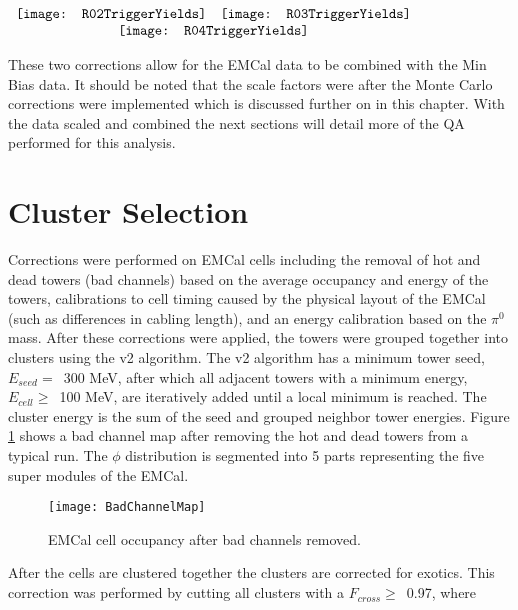 \begin{figure*}[t!]
$\begin{array}{rl}
    \texttt{[image: R02TriggerYields]} &
    \texttt{[image: R03TriggerYields]}\\
    \multicolumn{2}{c}{\texttt{[image: R04TriggerYields]}}
\end{array}$
\caption[EMCal triggered data correction factors for R=0.2, R=0.3, and R=0.4 jets.]{\label{fig:EMCalDownScale}EMCal triggered data correction factors for R=0.2, R=0.3, and R=0.4 jets.}
\end{figure*}

These two corrections allow for the EMCal data to be combined with the Min Bias data.  It should be noted that the scale factors were after the Monte Carlo corrections were implemented which is discussed further on in this chapter.  With the data scaled and combined the next sections will detail more of the QA performed for this analysis.


\section{Cluster Selection}
Corrections were performed on EMCal cells including the removal of hot and dead towers (bad channels) based on the average occupancy and energy of the towers, calibrations to cell timing caused by the physical layout of the EMCal (such as differences in cabling length), and an energy calibration based on the $\pi^{0}$ mass.  After these corrections were applied, the towers were grouped together into clusters using the v2 algorithm.  The v2 algorithm has a minimum tower seed, $E_{seed} = \,$ 300 MeV, after which all adjacent towers with a minimum energy, $E_{cell} \geq \,$ 100 MeV, are iteratively added until a local minimum is reached.  The cluster energy is the sum of the seed and grouped neighbor tower energies.  Figure \ref{fig:badchannel} shows a bad channel map after removing the hot and dead towers from a typical run.  The $\phi$ distribution is segmented into 5 parts representing the five super modules of the EMCal.

\begin{figure}[h]
\texttt{[image: BadChannelMap]}
\centering
\caption{EMCal cell occupancy after bad channels removed.}
\label{fig:badchannel}
\end{figure}

After the cells are clustered together the clusters are corrected for exotics.  This correction was performed by cutting all clusters with a $F_{cross} \geq \,$ 0.97, where

